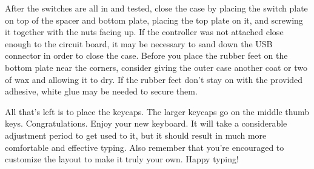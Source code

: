 \documentclass{article}
\begin{document}
After the switches are all in and tested, close the case by placing
the switch plate on top of the spacer and bottom plate, placing the
top plate on it, and screwing it together with the nuts facing up. If the
controller was not attached close enough to the circuit board, it may
be necessary to sand down the USB connector in order to close the
case. Before you place the rubber feet on the bottom plate near the
corners, consider giving the outer case another coat or two of wax and
allowing it to dry. If the rubber feet don't stay on with the provided
adhesive, white glue may be needed to secure them.

\vspace{1em}

All that's left is to place the keycaps. The larger keycaps go on the
middle thumb keys. Congratulations. Enjoy your new keyboard. It will
take a considerable adjustment period to get used to it, but it should
result in much more comfortable and effective typing. Also remember
that you're encouraged to customize the layout to make it truly your
own. Happy typing!

\end{document}
